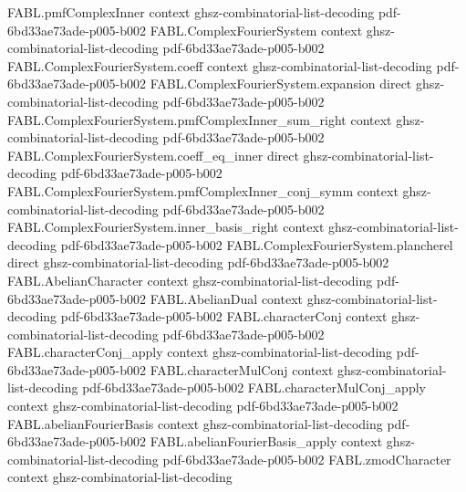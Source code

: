 \begin{theorem}
\label{FABL.ComplexFourierSystem.parseval}
\leanok
{}
\proofstep
  {FABL.pmfComplexInner}
  {context}
  {ghsz-combinatorial-list-decoding}
  {pdf-6bd33ae73ade-p005-b002}
\proofstep
  {FABL.ComplexFourierSystem}
  {context}
  {ghsz-combinatorial-list-decoding}
  {pdf-6bd33ae73ade-p005-b002}
\proofstep
  {FABL.ComplexFourierSystem.coeff}
  {context}
  {ghsz-combinatorial-list-decoding}
  {pdf-6bd33ae73ade-p005-b002}
\proofstep
  {FABL.ComplexFourierSystem.expansion}
  {direct}
  {ghsz-combinatorial-list-decoding}
  {pdf-6bd33ae73ade-p005-b002}
\proofstep
  {FABL.ComplexFourierSystem.pmfComplexInner_sum_right}
  {context}
  {ghsz-combinatorial-list-decoding}
  {pdf-6bd33ae73ade-p005-b002}
\proofstep
  {FABL.ComplexFourierSystem.coeff_eq_inner}
  {direct}
  {ghsz-combinatorial-list-decoding}
  {pdf-6bd33ae73ade-p005-b002}
\proofstep
  {FABL.ComplexFourierSystem.pmfComplexInner_conj_symm}
  {context}
  {ghsz-combinatorial-list-decoding}
  {pdf-6bd33ae73ade-p005-b002}
\proofstep
  {FABL.ComplexFourierSystem.inner_basis_right}
  {context}
  {ghsz-combinatorial-list-decoding}
  {pdf-6bd33ae73ade-p005-b002}
\proofstep
  {FABL.ComplexFourierSystem.plancherel}
  {direct}
  {ghsz-combinatorial-list-decoding}
  {pdf-6bd33ae73ade-p005-b002}
\proofstep
  {FABL.AbelianCharacter}
  {context}
  {ghsz-combinatorial-list-decoding}
  {pdf-6bd33ae73ade-p005-b002}
\proofstep
  {FABL.AbelianDual}
  {context}
  {ghsz-combinatorial-list-decoding}
  {pdf-6bd33ae73ade-p005-b002}
\proofstep
  {FABL.characterConj}
  {context}
  {ghsz-combinatorial-list-decoding}
  {pdf-6bd33ae73ade-p005-b002}
\proofstep
  {FABL.characterConj_apply}
  {context}
  {ghsz-combinatorial-list-decoding}
  {pdf-6bd33ae73ade-p005-b002}
\proofstep
  {FABL.characterMulConj}
  {context}
  {ghsz-combinatorial-list-decoding}
  {pdf-6bd33ae73ade-p005-b002}
\proofstep
  {FABL.characterMulConj_apply}
  {context}
  {ghsz-combinatorial-list-decoding}
  {pdf-6bd33ae73ade-p005-b002}
\proofstep
  {FABL.abelianFourierBasis}
  {context}
  {ghsz-combinatorial-list-decoding}
  {pdf-6bd33ae73ade-p005-b002}
\proofstep
  {FABL.abelianFourierBasis_apply}
  {context}
  {ghsz-combinatorial-list-decoding}
  {pdf-6bd33ae73ade-p005-b002}
\proofstep
  {FABL.zmodCharacter}
  {context}
  {ghsz-combinatorial-list-decoding}

\end{theorem}
